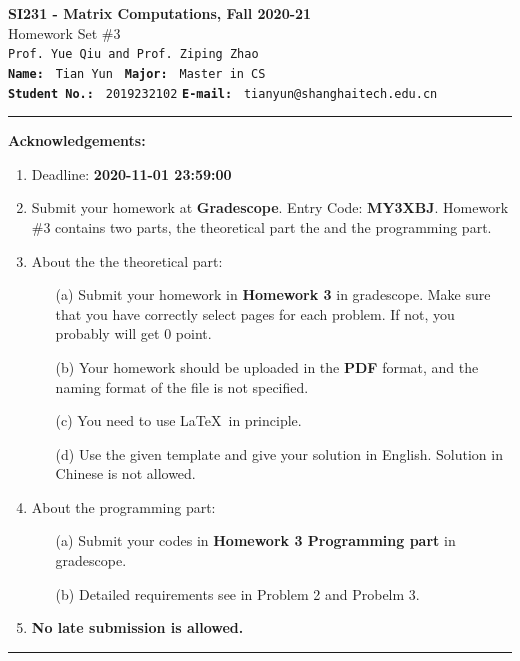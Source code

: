 \documentclass[english,onecolumn]{IEEEtran}
\begin{document}
\begin{center}
	\textbf{\LARGE{SI231 - Matrix Computations, Fall 2020-21}}\\
	{\Large Homework Set \#3}\\
	\texttt{Prof. Yue Qiu and Prof. Ziping Zhao}\\
	\texttt{\textbf{Name:}}   	\texttt{ Tian Yun }  		\hspace{1bp}
	\texttt{\textbf{Major:}}  	\texttt{ Master in CS } 	\\
	\texttt{\textbf{Student No.:}} 	\texttt{ 2019232102}     \hspace{1bp}
	\texttt{\textbf{E-mail:}} 	\texttt{ tianyun@shanghaitech.edu.cn}
\par\end{center}



\noindent
\rule{\linewidth}{0.4pt}
{\bf {\large Acknowledgements:}}
\begin{enumerate}
    \item Deadline: \textbf{2020-11-01 23:59:00}
    \item Submit your homework at \textbf{Gradescope}. Entry Code: \textbf{MY3XBJ}. 
    Homework \#3 contains two parts, the theoretical part the and the programming part.
    \item About the the theoretical part:
    \begin{enumerate}
            \item[(a)] Submit your homework in \textbf{Homework 3} in gradescope. Make sure that you have correctly select pages for each problem. If not, you probably will get 0 point.
            \item[(b)] Your homework should be uploaded in the \textbf{PDF} format, and the naming format of the file is not specified.
            \item[(c)] You need to use \LaTeX $\,$ in principle.
            \item[(d)] Use the given template and give your solution in English. Solution in Chinese is not allowed. 
        \end{enumerate}
  \item About the programming part:
  \begin{enumerate}
      \item[(a)] Submit your codes in \textbf{Homework 3 Programming part} in gradescope.
      \item[(b)] Detailed requirements see in Problem 2 and Probelm 3.
  \end{enumerate}
  \item \textbf{No late submission is allowed.}
\end{enumerate}
\rule{\linewidth}{0.4pt}
\newpage 
\end{document}
